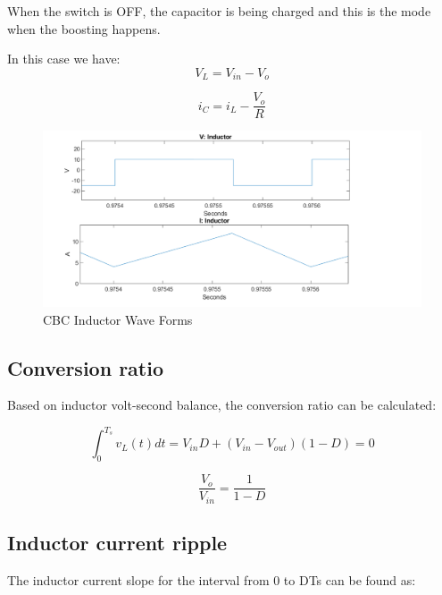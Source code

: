 When the switch is OFF,
the capacitor is being charged and this is the mode when the boosting happens.

In this case we have:
\begin{equation}
	V_L = V_{in} - V_o
	\label{eq:CBC_SWOFF1}
\end{equation}

\begin{equation}
	i_C = i_L -\frac{V_o}{R}
	\label{eq:CBC_SWOFF2}
\end{equation}

\begin{figure}[H]
   \centering
   \includegraphics[width=\textwidth]{figures/aConventionalBoost/LvAndLi.pdf}
    \caption{CBC Inductor Wave Forms}
	\label{fig:CBC_InductorWaveForms}
\end{figure}

\subsection{Conversion ratio}\label{sec:conversionRatio}

Based on inductor volt-second balance, the conversion ratio can be calculated:

\begin{equation}
	\int_{0}^{T_s} v_L(t)dt = V_{in}D + (V_{in}-V_{out})(1-D) = 0
	\label{eq:CBC_VISB}
\end{equation}

\begin{equation}
	\frac{V_o}{V_{in}} = \frac{1}{1-D}
	\label{eq:CBC_CR}
\end{equation}

\subsection{Inductor current ripple}\label{sec:CBC_ICR}

The inductor current slope for the interval from 0 to DTs can be found as:

